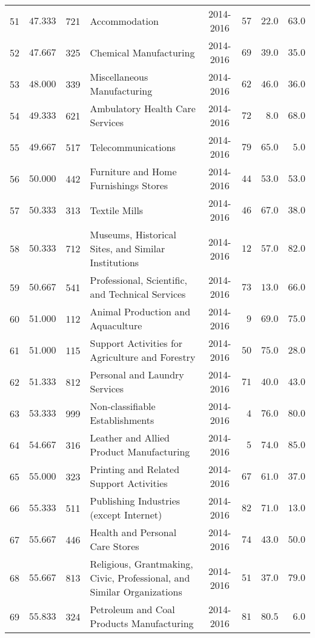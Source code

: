 \documentclass[9pt, oneside]{article}   	%
\begin{document}
\begin{longtable}{cccp{2.0in}cccc}
51  & $47.333$ & 721 & Accommodation & 2014-2016 & $57$ & $22.0$ & $63.0$ \\
52  & $47.667$ & 325 & Chemical Manufacturing & 2014-2016 & $69$ & $39.0$ & $35.0$ \\
53  & $48.000$ & 339 & Miscellaneous Manufacturing & 2014-2016 & $62$ & $46.0$ & $36.0$ \\
54  & $49.333$ & 621 & Ambulatory Health Care Services & 2014-2016 & $72$ & $\phantom{0}8.0$ & $68.0$ \\
55  & $49.667$ & 517 & Telecommunications & 2014-2016 & $79$ & $65.0$ & $\phantom{0}5.0$ \\
56  & $50.000$ & 442 & Furniture and Home Furnishings Stores & 2014-2016 & $44$ & $53.0$ & $53.0$ \\
57  & $50.333$ & 313 & Textile Mills & 2014-2016 & $46$ & $67.0$ & $38.0$ \\
58  & $50.333$ & 712 & Museums, Historical Sites, and Similar Institutions & 2014-2016 & $12$ & $57.0$ & $82.0$ \\
59  & $50.667$ & 541 & Professional, Scientific, and Technical Services & 2014-2016 & $73$ & $13.0$ & $66.0$ \\
60  & $51.000$ & 112 & Animal Production and Aquaculture & 2014-2016 & $\phantom{0}9$ & $69.0$ & $75.0$ \\
61  & $51.000$ & 115 & Support Activities for Agriculture and Forestry & 2014-2016 & $50$ & $75.0$ & $28.0$ \\
62  & $51.333$ & 812 & Personal and Laundry Services & 2014-2016 & $71$ & $40.0$ & $43.0$ \\
63  & $53.333$ & 999 & Non-classifiable Establishments & 2014-2016 & $\phantom{0}4$ & $76.0$ & $80.0$ \\
64  & $54.667$ & 316 & Leather and Allied Product Manufacturing & 2014-2016 & $\phantom{0}5$ & $74.0$ & $85.0$ \\
65  & $55.000$ & 323 & Printing and Related Support Activities & 2014-2016 & $67$ & $61.0$ & $37.0$ \\
66  & $55.333$ & 511 & Publishing Industries (except Internet) & 2014-2016 & $82$ & $71.0$ & $13.0$ \\
67  & $55.667$ & 446 & Health and Personal Care Stores & 2014-2016 & $74$ & $43.0$ & $50.0$ \\
68  & $55.667$ & 813 & Religious, Grantmaking, Civic, Professional, and Similar Organizations & 2014-2016 & $51$ & $37.0$ & $79.0$ \\
69  & $55.833$ & 324 & Petroleum and Coal Products Manufacturing & 2014-2016 & $81$ & $80.5$ & $\phantom{0}6.0$ \\

\end{longtable}
\end{document}
